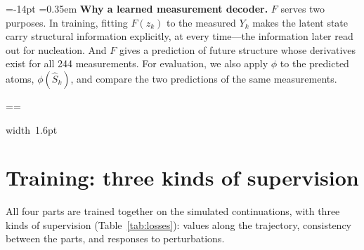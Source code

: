 \documentclass[11pt,a4paper]{article}
\makeatletter
\numberwithin{equation}{section}
\newcommand{\pcmWhyPiece}[1]{%
  \noindent\hbox{{\color{pcmAmber}\vrule width 1.6pt}%
    \setlength{\fboxsep}{7pt}\colorbox{pcmAmber!5}{\vbox{\unvbox#1}}}\par}
\newcommand{\pcmWhyEmit}{%
  \vbadness=10000
  \loop
    \par
    \ifdim\pagegoal=\maxdimen
      \pcmWhyAvail=\dimexpr\vsize-14pt\relax
    \else
      \pcmWhyAvail=\dimexpr\pagegoal-\pagetotal-19pt\relax
    \fi
    \ifdim\dimexpr\ht\pcmWhyAll+\dp\pcmWhyAll\relax>\pcmWhyAvail
      \ifdim\pcmWhyAvail<3\baselineskip
        \newpage
      \else
        \setbox\pcmWhyPart\vsplit\pcmWhyAll to \pcmWhyAvail
        \pcmWhyPiece\pcmWhyPart
      \fi
    \else
      \pcmWhyPiece\pcmWhyAll
    \fi
  \ifvoid\pcmWhyAll\else\repeat}
\newenvironment{why}[1][Why]{%
  \par\addvspace{.55em}%
  \setbox\pcmWhyAll\vbox\bgroup
    \hsize=\dimexpr\linewidth-1.6pt-14pt\relax
    \@parboxrestore\fussy
    \parskip=0.35em\relax
    \noindent\textcolor{pcmAmber}{\bfseries #1.}\enspace\ignorespaces}%
 {\par\egroup
  \splittopskip=\topskip\splitmaxdepth=\maxdepth
  \pcmWhyEmit
  \par\addvspace{.55em}}
\makeatother
\begin{document}
\begin{why}[Why a learned measurement decoder]
$F$ serves two purposes. In training, fitting $F(z_k)$ to the measured $Y_k$ makes
the latent state carry structural information explicitly, at every time---the
information later read out for nucleation. And $F$ gives a prediction of future
structure whose derivatives exist for all 244 measurements. For evaluation, we also
apply $\phi$ to the predicted atoms, $\phi(\widehat S_k)$, and compare the two
predictions of the same measurements.
\end{why}

\section{Training: three kinds of supervision}
\label{sec:training}

All four parts are trained together on the simulated continuations, with three
kinds of supervision (Table~\ref{tab:losses}): values along the trajectory,
consistency between the parts, and responses to perturbations.
\end{document}
